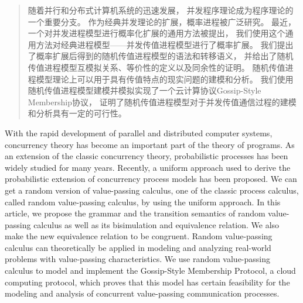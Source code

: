
\begin{abstract}
  随着并行和分布式计算机系统的迅速发展，
  并发程序理论成为程序理论的一个重要分支。
  作为经典并发理论的扩展，概率进程被广泛研究。
  最近，一个对并发进程模型进行概率化扩展的通用方法被提出，
  我们使用这个通用方法对经典进程模型——并发传值进程模型进行了概率扩展。
  我们提出了概率扩展后得到的随机传值进程模型的语法和转移语义，
  并给出了随机传值进程模型互模拟关系、等价性的定义以及同余性的证明。
  随机传值进程模型理论上可以用于具有传值特点的现实问题的建模和分析。
  我们使用随机传值进程模型建模并模拟实现了一个云计算协议Gossip-Style Membership协议，
  证明了随机传值进程模型对于并发传值通信过程的建模和分析具有一定的可行性。
\end{abstract}

\begin{enabstract}
  With the rapid development of parallel and distributed computer systems,
  concurrency theory has become an important part of the theory of programs.
  As an extension of the classic concurrency theory,
  probabilistic processes has been widely studied for many years.
  Recently, a uniform approach used to derive the probabilistic extension of 
  concurrency process models has been proposed.
  We can get a random version of value-passing calculus,
  one of the classic process calculus, called random value-passing calculus, 
  by using the uniform approach.
  In this article, we propose the grammar and the transition semantics of random value-passing calculus
  as well as its bisimulation and equivalence relation.
  We also make the new equivalence relation to be congruent. 
  Random value-passing calculus can theoretically 
  be applied in modeling and analyzing real-world problems with value-passing characteristics.
  We use random value-passing calculus to model and implement
  the Gossip-Style Membership Protocol, a cloud computing protocol,
  which proves that this model has certain feasibility 
  for the modeling and analysis of concurrent value-passing communication processes.
\end{enabstract}
